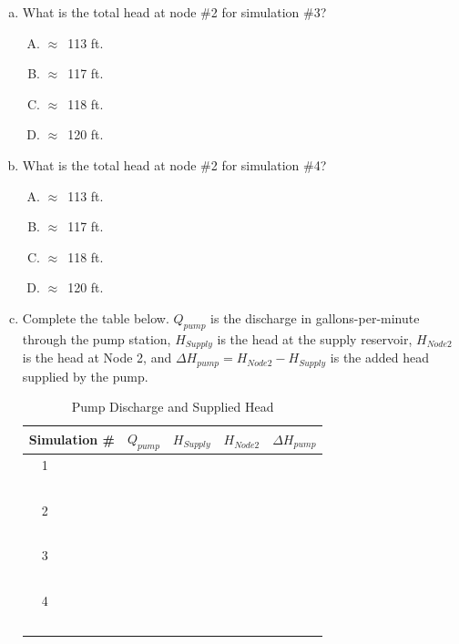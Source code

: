 \documentclass[11pt]{article}
\begin{document}
\begin{enumerate}
\begin{enumerate}[a)]
\item What is the total head at node \#2 for simulation \#3?
\begin{enumerate}[A)]
\item $\approx$~113 ft.
\item $\approx$~117 ft.
\item $\approx$~118 ft.
\item $\approx$~120 ft. 
\end{enumerate}
\newpage

\item What is the total head at node \#2 for simulation \#4?
\begin{enumerate}[A)]
\item $\approx$~113 ft.
\item $\approx$~117 ft.
\item $\approx$~118 ft.
\item $\approx$~120 ft. 
\end{enumerate}


\item Complete the table below.  $Q_{pump}$ is the discharge in gallons-per-minute through the pump station, $H_{Supply}$ is the head at the supply reservoir,  $H_{Node2}$ is the head at Node 2, and $\Delta H_{pump} =  H_{Node2} - H_{Supply}$ is the added head supplied by the pump.
\begin{table}[htbp]
   \centering
      \caption{Pump Discharge and Supplied Head}
   \begin{tabular}{p{1in} p{1in} p{1in} p{1in} p{1in} } %
Simulation \# & $Q_{pump}$ & $H_{Supply}$ & $H_{Node2}$ & $\Delta H_{pump}$ \\
\hline
\hline
~~1 & ~ &~ & ~ & ~ \\
~ & ~ &~ & ~ & ~ \\
\hline
~~2 & ~ &~ & ~ & ~ \\
~ & ~ &~ & ~ & ~ \\
\hline
~~3 & ~ &~ & ~ & ~\\
~ & ~ &~ & ~ & ~ \\
\hline
~~4 & ~ &~ & ~ & ~ \\
~ & ~ &~ & ~ & ~ \\
\hline
   \end{tabular}
   \label{tab:pump-curve}
\end{table}


\end{enumerate}
\end{enumerate}
\end{document}
